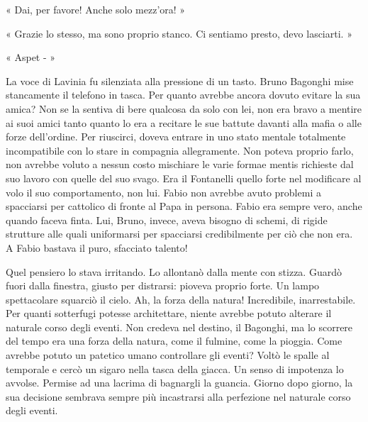 « Dai, per favore! Anche solo mezz'ora! »

« Grazie lo stesso, ma sono proprio stanco. Ci sentiamo presto, devo lasciarti. »

« Aspet - »

La voce di Lavinia fu silenziata alla pressione di un tasto. Bruno Bagonghi mise stancamente il telefono in tasca. Per quanto avrebbe ancora dovuto evitare la sua amica? Non se la sentiva di bere qualcosa da solo con lei, non era bravo a mentire ai suoi amici tanto quanto lo era a recitare le sue battute davanti alla mafia o alle forze dell'ordine. Per riuscirci, doveva entrare in uno stato mentale totalmente incompatibile con lo stare in compagnia allegramente. Non poteva proprio farlo, non avrebbe voluto a nessun costo mischiare le varie formae mentis richieste dal suo lavoro con quelle del suo svago. Era il Fontanelli quello forte nel modificare al volo il suo comportamento, non lui. Fabio non avrebbe avuto problemi a spacciarsi per cattolico di fronte al Papa in persona. Fabio era sempre vero, anche quando faceva finta. Lui, Bruno, invece, aveva bisogno di schemi, di rigide strutture alle quali uniformarsi per spacciarsi credibilmente per ciò che non era. A Fabio bastava il puro, sfacciato talento!

Quel pensiero lo stava irritando. Lo allontanò dalla mente con stizza. Guardò fuori dalla finestra, giusto per distrarsi: pioveva proprio forte. Un lampo spettacolare squarciò il cielo. Ah, la forza della natura! Incredibile, inarrestabile. Per quanti sotterfugi potesse architettare, niente avrebbe potuto alterare il naturale corso degli eventi. Non credeva nel destino, il Bagonghi, ma lo scorrere del tempo era una forza della natura, come il fulmine, come la pioggia. Come avrebbe potuto un patetico umano controllare gli eventi? Voltò le spalle al temporale e cercò un sigaro nella tasca della giacca. Un senso di impotenza lo avvolse. Permise ad una lacrima di bagnargli la guancia. Giorno dopo giorno, la sua decisione sembrava sempre più incastrarsi alla perfezione nel naturale corso degli eventi.

